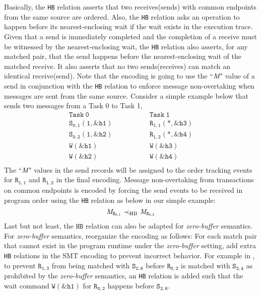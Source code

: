 Basically, the \texttt{HB} relation asserts that two receives(sends) with common endpoints from the same source are ordered. Also, the \texttt{HB} relation asks an operation to happen before its nearest-enclosing wait if the wait exists in the execution trace. Given that a send is immediately completed and the completion of a receive must be witnessed  by the nearest-enclosing wait, the \texttt{HB} relation also asserts, for any matched pair, that the send happens before the nearest-enclosing wait of the matched receive. It also asserts that no two sends(receives) can match an identical receive(send). Note that the encoding is going to use the ``$\emph{M}$"  value of a send in conjunction with the \texttt{HB} relation to enforce message non-overtaking when messages are sent from the same source. Consider a simple example below that sends two messages from a Task 0 to Task 1,
\[
\begin{array}{l|l}
\;\;\;\;\;\;\;\;\mathtt{Task\ 0}\;\;\;\;\;\;\;\; & \;\;\;\;\;\;\;\; \mathtt{Task\ 1}\;\;\;\;\;\;\;\; \\
\hline
\;\;\;\;\;\;\;\;\mathtt{S_{0,1}(1,\&h1)}\;\;\;\;\;\;\;\; & \;\;\;\;\;\;\;\; \mathtt{R_{1,1}(*,\&h3)}\;\;\;\;\;\;\;\; \\
\;\;\;\;\;\;\;\;\mathtt{S_{0,2}(1,\&h2)}\;\;\;\;\;\;\;\; & \;\;\;\;\;\;\;\; \mathtt{R_{1,2}(*,\&h4)}\;\;\;\;\;\;\;\; \\
\;\;\;\;\;\;\;\;\mathtt{W(\&h1)}\;\;\;\;\;\;\;\; & \;\;\;\;\;\;\;\; \mathtt{W(\&h3)}\;\;\;\;\;\;\;\; \\
\;\;\;\;\;\;\;\;\mathtt{W(\&h2)}\;\;\;\;\;\;\;\; & \;\;\;\;\;\;\;\; \mathtt{W(\&h4)}\;\;\;\;\;\;\;\; \\
\end{array}
\]
The ``$\emph{M}$" values in the send records will be assigned to the order tracking events for $\mathtt{R_{1,1}}$ and $\mathtt{R_{1,2}}$ in the final encoding. Message non-overtaking from transactions on common endpoints is encoded by forcing the send events to be received in program order using the \texttt{HB} relation as below in our simple example:
\[\cfgnt{M}_\mathtt{S_{0,1}}\ \mathrm{\prec_{HB}}\ \cfgnt{M}_\mathtt{S_{0,2}}\]
Last but not least, the $\mathtt{HB}$ relation can also be adapted for \textit{zero-buffer} semantics. For \textit{zero-buffer} semantics, reorganize the encoding as follows: For each match pair that cannot exist in the program runtime under the \textit{zero-buffer} setting, add extra \texttt{HB} relations in the SMT encoding to prevent incorrect behavior. For example in , to prevent $\mathtt{R_{1,3}}$ from being matched with $\mathtt{S_{2,6}}$ before $\mathtt{R_{0,2}}$ is matched with $\mathtt{S_{2,4}}$ as prohibited by the \textit{zero-buffer} semantics, an \texttt{HB} relation is added such that the wait command $\mathtt{W(\&h1)}$ for $\mathtt{R_{0,2}}$ happens before $\mathtt{S_{2,6}}$.


